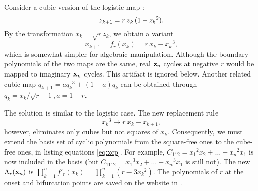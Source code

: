 \documentclass{ws-ijbc}
\begin{document}
Consider a cubic version of the logistic map :
\begin{equation}
  z_{k+1} = r \, z_k \, (1 - {z_k}^2).
  \notag
\end{equation}
%
By the transformation $x_k = \sqrt{r} z_k$,
%
we obtain a variant
\cite{strogatz}
%
\begin{equation}
  x_{k + 1} = f_r(x_k) = r \, x_k - {x_k}^3,
\label{eq:cubic}
\end{equation}
%
which is somewhat simpler for algebraic manipulation.
%
Although the boundary polynomials of the two maps are the same,
  real $\mathbf{z}_{n}$ cycles at negative $r$
  would be mapped to imaginary $\mathbf{x}_{n}$ cycles.
%
This artifact is ignored below.
%
%
Another related cubic map
  $q_{k+1} = a {q_k}^3 + (1-a) q_k$ \cite{may2, brown3, brown4}
  can be obtained through $q_k = x_k/\sqrt{r-1}, a = 1-r$.



The solution is similar to the logistic case.
%
The new replacement rule
\begin{equation}
  {x_k}^3 \rightarrow r \, x_k - x_{k+1},
\label{eq:cubreplace}
\end{equation}
however, eliminates only cubes but not squares of $x_k$.
%
Consequently, we must extend the basis set of cyclic polynomials
  from the square-free ones to the cube-free ones,
  in listing equations \eqref{eq:xcp}.
For example,
  $C_{112} = {x_1}^2 x_2 + \dots + {x_n}^2 x_1$
  is now included in the basis
  (but
  $C_{1112} = {x_1}^3 x_2 + \dots + {x_n}^3 x_1$
  is still not).
The new $\Lambda_r(\mathbf{x}_{n})$ is
  $\prod_{k=1}^n f'_r(x_k) = \prod_{k=1}^n (r - 3 {x_k}^2)$.
%
%
The polynomials of $r$
  at the onset and bifurcation points
  are saved on the website in .
%
%
\end{document}
